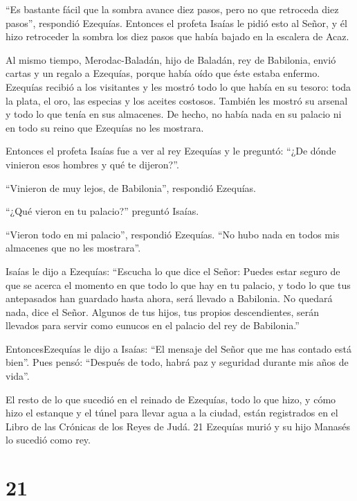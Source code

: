  ``Es bastante fácil que la sombra avance diez pasos, pero
no que retroceda diez pasos'', respondió Ezequías. 
Entonces el profeta Isaías le pidió esto al Señor, y él hizo retroceder
la sombra los diez pasos que había bajado en la escalera de Acaz.

 Al mismo tiempo, Merodac-Baladán, hijo de Baladán, rey de
Babilonia, envió cartas y un regalo a Ezequías, porque había oído que
éste estaba enfermo.  Ezequías recibió a los visitantes y
les mostró todo lo que había en su tesoro: toda la plata, el oro, las
especias y los aceites costosos. También les mostró su arsenal y todo lo
que tenía en sus almacenes. De hecho, no había nada en su palacio ni en
todo su reino que Ezequías no les mostrara.

 Entonces el profeta Isaías fue a ver al rey Ezequías y le
preguntó: ``¿De dónde vinieron esos hombres y qué te dijeron?''.

``Vinieron de muy lejos, de Babilonia'', respondió Ezequías.

 ``¿Qué vieron en tu palacio?'' preguntó Isaías.

``Vieron todo en mi palacio'', respondió Ezequías. ``No hubo nada en
todos mis almacenes que no les mostrara''.

 Isaías le dijo a Ezequías: ``Escucha lo que dice el Señor:
 Puedes estar seguro de que se acerca el momento en que
todo lo que hay en tu palacio, y todo lo que tus antepasados han
guardado hasta ahora, será llevado a Babilonia. No quedará nada, dice el
Señor.  Algunos de tus hijos, tus propios descendientes,
serán llevados para servir como eunucos en el palacio del rey de
Babilonia.''

 EntoncesEzequías le dijo a Isaías: ``El mensaje del Señor
que me has contado está bien''. Pues pensó: ``Después de todo, habrá paz
y seguridad durante mis años de vida''.

 El resto de lo que sucedió en el reinado de Ezequías, todo
lo que hizo, y cómo hizo el estanque y el túnel para llevar agua a la
ciudad, están registrados en el Libro de las Crónicas de los Reyes de
Judá. 21 Ezequías murió y su hijo Manasés lo sucedió como rey.

\hypertarget{section-20}{%
\section{21}\label{section-20}}

